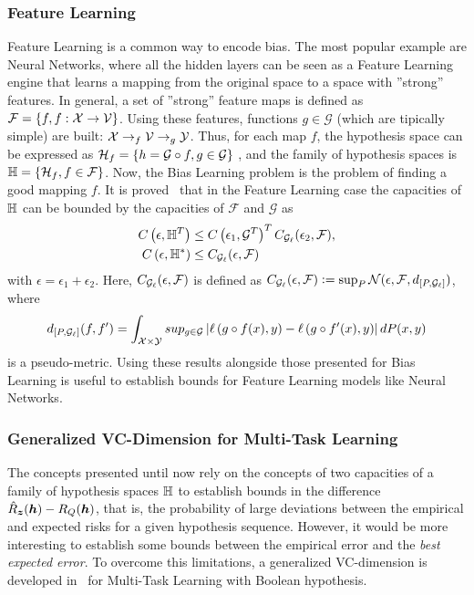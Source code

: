 \subsubsection*{Feature Learning}
Feature Learning is a common way to encode bias. The most popular example are Neural Networks, where all the hidden layers can be seen as a Feature Learning engine that learns a mapping from the original space to a space with ''strong'' features.
In general, a set of ''strong'' feature maps is defined as $\mathcal{F} = \left\{f, f: \mathcal{X} \to \mathcal{V}\right\}$. Using these features, functions $g \in \mathcal{G}$ (which are tipically simple) are built:
$\mathcal{X} \to_f \mathcal{V} \to_g \mathcal{Y}$.
Thus, for each map $f$, the hypothesis space can be expressed as 
$\mathcal{H}_f = \left\{h = \mathcal{G} \circ f, g \in \mathcal{G}\right\}$
, and the family of hypothesis spaces is 
$\mathbb{H} = \left\{\mathcal{H}_f, f \in \mathcal{F}\right\}$.
Now, the Bias Learning problem is the problem of finding a good mapping $f$.
It is proved~\cite[Theorem~6]{baxter2000model} that in the Feature Learning case the capacities of $\mathbb{H}$ can be bounded by the capacities of $\mathcal{F}$ and $\mathcal{G}$ as
\begin{align*}
    C\left(\epsilon, \mathbb{H}^{T}\right) &\leq C\left(\epsilon_1, \mathcal{G}^T\right)^T C_{\mathcal{G}_\ell}(\epsilon_2, \mathcal{F}) , \\
    C\left(\epsilon, \mathbb{H}^{*}\right) &\leq C_{\mathcal{G}_\ell}(\epsilon, \mathcal{F})
\end{align*}
with $\epsilon = \epsilon_1 + \epsilon_2 $. Here, $C_{\mathcal{G}_\ell}(\epsilon, \mathcal{F})$ is defined as 
$C_{\mathcal{G}_\ell}(\epsilon, \mathcal{F}) \vcentcolon= \sup_P \mathcal{N}(\epsilon, \mathcal{F}, d_{[P, \mathcal{G}_\ell]})$, where
$$ d_{[P, \mathcal{G}_\ell]}(f, f') = \int_{\mathcal{X} \times \mathcal{Y}} sup_{g \in \mathcal{G}} \left|\ell\left( g \circ f(x), y\right) - \ell\left( g \circ f'(x), y\right)\right| dP(x, y)$$
is a pseudo-metric. Using these results alongside those presented for Bias Learning is useful to establish bounds for Feature Learning models like Neural Networks.

\subsubsection*{Generalized VC-Dimension for Multi-Task Learning}
The concepts presented until now rely on the concepts of two capacities of a family of hypothesis spaces $\mathbb{H}$ to establish bounds in the difference $\hat{R}_{\bm{z}}(\bm{h}) - R_Q(\bm{h})$, that is, the probability of large deviations between the empirical and expected risks for a given hypothesis sequence. However, it would be more interesting to establish some bounds between the empirical error and the \emph{best expected error}.
To overcome this limitations, a generalized VC-dimension is developed in~\cite{baxter2000model} for Multi-Task Learning with Boolean hypothesis.
%

